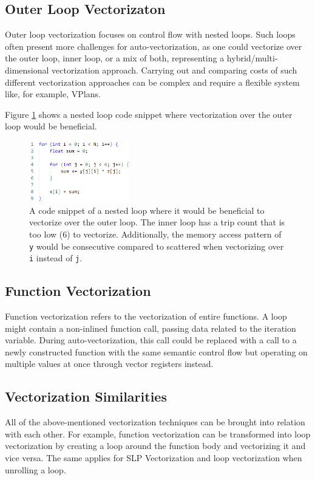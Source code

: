 \documentclass[sigplan,11pt,nonacm]{acmart}
\begin{document}
\subsection{Outer Loop Vectorizaton}
Outer loop vectorization focuses on control flow with nested loops. Such loops often present
more challenges for auto-vectorization, as one could vectorize over the outer loop,
inner loop, or a mix of both, representing a hybrid/multi-dimensional vectorization approach. 
Carrying out and comparing costs of such different vectorization approaches can be complex 
and require a flexible system like, for example, VPlans. 

Figure \ref{fig:outer-loop-vec} shows a nested loop code snippet where vectorization over the
outer loop would be beneficial.

\begin{figure}
  \centering
  \includegraphics[width=0.39\textwidth]{images/outer-loop-vec.png}
  \caption{A code snippet of a nested loop where it would be beneficial to vectorize over the 
  outer loop. The inner loop has a trip count that is too low (6) to vectorize. Additionally,
  the memory access pattern of \texttt{y} would be consecutive compared to scattered when
  vectorizing over \texttt{i} instead of \texttt{j}.}
  \label{fig:outer-loop-vec}
\end{figure}

\subsection{Function Vectorization}
Function vectorization refers to the vectorization of entire functions. A loop might contain a
non-inlined function call, passing data related to the iteration variable. During auto-vectorization, 
this call could be replaced with a call to a newly constructed function with the same semantic 
control flow but operating on multiple values at once through vector registers instead.

\subsection{Vectorization Similarities}
All of the above-mentioned vectorization techniques can be brought into relation with each other. 
For example, function vectorization can be transformed into loop vectorization by creating a loop 
around the function body and vectorizing it and vice versa. The same applies for SLP Vectorization 
and loop vectorization when unrolling a loop.
 
\end{document}
